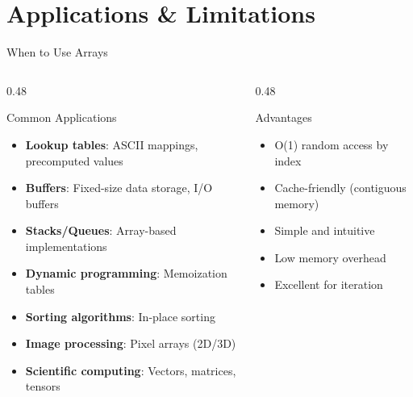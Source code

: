 \documentclass[aspectratio=169,xcolor=dvipsnames]{beamer}
\begin{document}
\section{Applications \& Limitations}

\begin{frame}{When to Use Arrays}
  \begin{columns}
    \begin{column}{0.48\textwidth}
      \begin{block}{Common Applications}
        \begin{itemize}
          \item \textbf{Lookup tables}: ASCII mappings, precomputed values
          \item \textbf{Buffers}: Fixed-size data storage, I/O buffers
          \item \textbf{Stacks/Queues}: Array-based implementations
          \item \textbf{Dynamic programming}: Memoization tables
          \item \textbf{Sorting algorithms}: In-place sorting
          \item \textbf{Image processing}: Pixel arrays (2D/3D)
          \item \textbf{Scientific computing}: Vectors, matrices, tensors
        \end{itemize}
      \end{block}
    \end{column}
    \begin{column}{0.48\textwidth}
      \begin{block}{Advantages}
        \begin{itemize}
          \item[$\checkmark$] O(1) random access by index
          \item[$\checkmark$] Cache-friendly (contiguous memory)
          \item[$\checkmark$] Simple and intuitive
          \item[$\checkmark$] Low memory overhead
          \item[$\checkmark$] Excellent for iteration
        \end{itemize}
      \end{block}

      \vspace{0.2cm}


\end{column}
\end{columns}
\end{frame}
\end{document}
